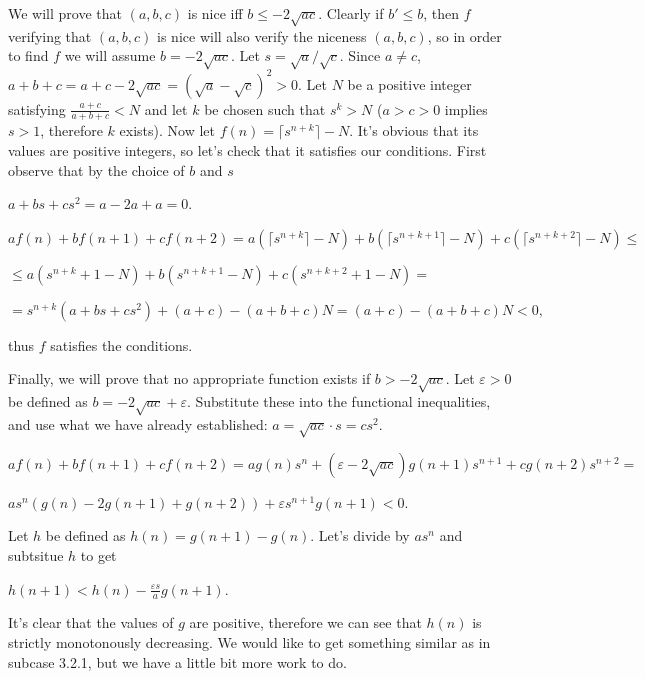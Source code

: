 \documentclass{article}
\begin{document}
We will prove that \(\displaystyle (a,b,c)\) is nice iff \(\displaystyle b\le -2\sqrt{ac}\). Clearly if \(\displaystyle b'\le b\), then \(\displaystyle f\) verifying that \(\displaystyle (a,b,c)\) is nice will also verify the niceness \(\displaystyle (a,b,c)\), so in order to find \(\displaystyle f\) we will assume \(\displaystyle b=-2\sqrt{ac}\). Let \(\displaystyle s=\sqrt{a}/\sqrt{c}\). Since \(\displaystyle a\neq c\), \(\displaystyle a+b+c=a+c-2\sqrt{ac}=(\sqrt{a}-\sqrt{c})^2>0\). Let \(\displaystyle N\) be a positive integer satisfying \(\displaystyle \frac{a+c}{a+b+c}<N\) and let \(\displaystyle k\) be chosen such that \(\displaystyle s^k>N\) (\(\displaystyle a>c>0\) implies \(\displaystyle s>1\), therefore \(\displaystyle k\) exists). Now let \(\displaystyle f(n)=\lceil s^{n+k} \rceil - N\). It's obvious that its values are positive integers, so let's check that it satisfies our conditions. First observe that by the choice of \(\displaystyle b\) and \(\displaystyle s\)

\(\displaystyle a+bs+cs^2=a-2a+a=0.\)

\(\displaystyle af(n)+bf(n+1)+cf(n+2)=a(\lceil s^{n+k} \rceil - N)+b(\lceil s^{n+k+1} \rceil - N)+c(\lceil s^{n+k+2} \rceil - N) \leq\)

\(\displaystyle \leq a(s^{n+k} +1- N)+b( s^{n+k+1} - N)+c( s^{n+k+2} +1 - N)=\)

\(\displaystyle =s^{n+k}(a+bs+cs^2)+(a+c)-(a+b+c)N=(a+c)-(a+b+c)N<0,\)

thus \(\displaystyle f\) satisfies the conditions.

Finally, we will prove that no appropriate function exists if \(\displaystyle b>-2\sqrt{ac}\). Let \(\displaystyle \varepsilon>0\) be defined as \(\displaystyle b=-2\sqrt{ac}+\varepsilon\). Substitute these into the functional inequalities, and use what we have already established: \(\displaystyle a = \sqrt{ac}\cdot s = cs^2\).

\(\displaystyle af(n)+bf(n+1)+cf(n+2)=ag(n)s^n+(\varepsilon-2\sqrt{ac})g(n+1)s^{n+1}+cg(n+2)s^{n+2}=\)

\(\displaystyle as^n(g(n)-2g(n+1)+g(n+2))+\varepsilon s^{n+1}g(n+1)<0.\)

Let \(\displaystyle h\) be defined as \(\displaystyle h(n)=g(n+1)-g(n)\). Let's divide by \(\displaystyle as^n\) and subtsitue \(\displaystyle h\) to get

\(\displaystyle h(n+1)<h(n)-\frac{\varepsilon s}{a}g(n+1).\)

It's clear that the values of \(\displaystyle g\) are positive, therefore we can see that \(\displaystyle h(n)\) is strictly monotonously decreasing. We would like to get something similar as in subcase 3.2.1, but we have a little bit more work to do.
\end{document}
